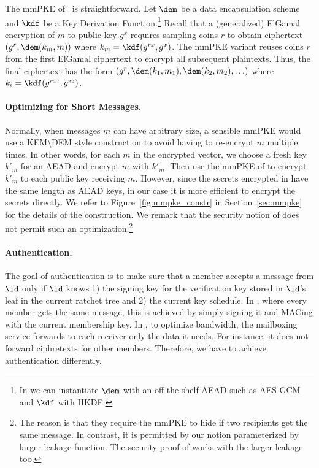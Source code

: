 The mmPKE of~\cite{ASIACCS:PinPoeSch14} is straightforward. Let $\dem$ be a
data encapsulation scheme and $\kdf$ be a Key Derivation
Function.\footnote{In \saik we can instantiate $\dem$ with an off-the-shelf
AEAD such as AES-GCM and $\kdf$ with HKDF.} Recall that a (generalized)
ElGamal encryption of $m$ to public key $g^x$ requires sampling coins $r$ to
obtain ciphertext $(g^r, \dem(k_m, m))$ where $k_m = \kdf(g^{rx}, g^x)$. The
mmPKE variant reuses coins $r$ from the first ElGamal ciphertext to encrypt
all subsequent plaintexts. Thus, the final ciphertext has the form $(g^r,
\dem(k_1, m_1), \dem(k_2, m_2),\ldots)$ where $k_i = \kdf(g^{rx_i},
g^{x_i})$.

\paragraph{Optimizing for Short Messages.}
Normally, when messages $m$ can have arbitrary size, a sensible mmPKE would use a
KEM{\textbackslash}DEM style construction to avoid having to re-encrypt $m$
multiple times. In other words, for each $m$ in the encrypted vector, we choose a fresh key $k'_m$
for an AEAD and encrypt $m$ with $k'_m$. Then use the mmPKE of
\cite{ASIACCS:PinPoeSch14} to encrypt $k'_m$ to each public key receiving $m$.
However, since the secrets encrypted in \saik have the same length as AEAD
keys, in our case it is more efficient to encrypt the secrets directly.
We refer to Figure~\ref{fig:mmpke_constr} in
Section~\ref{sec:mmpke} for the details of the construction.
%
We remark that the security notion of \cite{ASIACCS:PinPoeSch14} does not
permit such an optimization.\footnote{The
  reason is that they require the mmPKE to hide if two recipients get the same message. In contrast, it is permitted by our notion parameterized by larger leakage function. The security proof of \saik works with the larger leakage too.}

\paragraph{Authentication.}
The goal of authentication is to make sure that a member accepts a message from $\id$ only if $\id$ knows 1) the signing key for the verification key stored in $\id$'s leaf in the current ratchet tree and 2) the current key schedule.
In \protITK, where every member gets the same message, this is achieved by simply signing it and MACing with the current membership key.
In \saik, to optimize bandwidth, the mailboxing service forwards to each receiver
only the data it needs. For instance, it does not forward ciphretexts for other members. Therefore, we have to achieve authentication differently.

